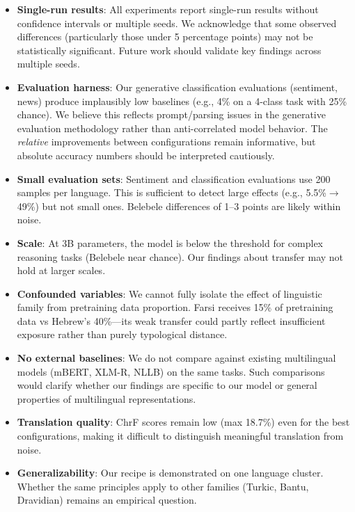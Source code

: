 \documentclass[10pt,twocolumn]{article}
\begin{document}
\begin{itemize}
    \item \textbf{Single-run results}: All experiments report single-run results without confidence intervals or multiple seeds. We acknowledge that some observed differences (particularly those under 5 percentage points) may not be statistically significant. Future work should validate key findings across multiple seeds.
    \item \textbf{Evaluation harness}: Our generative classification evaluations (sentiment, news) produce implausibly low baselines (e.g., 4\% on a 4-class task with 25\% chance). We believe this reflects prompt/parsing issues in the generative evaluation methodology rather than anti-correlated model behavior. The \emph{relative} improvements between configurations remain informative, but absolute accuracy numbers should be interpreted cautiously.
    \item \textbf{Small evaluation sets}: Sentiment and classification evaluations use 200 samples per language. This is sufficient to detect large effects (e.g., 5.5\%$\rightarrow$49\%) but not small ones. Belebele differences of 1--3 points are likely within noise.
    \item \textbf{Scale}: At 3B parameters, the model is below the threshold for complex reasoning tasks (Belebele near chance). Our findings about transfer may not hold at larger scales.
    \item \textbf{Confounded variables}: We cannot fully isolate the effect of linguistic family from pretraining data proportion. Farsi receives 15\% of pretraining data vs Hebrew's 40\%---its weak transfer could partly reflect insufficient exposure rather than purely typological distance.
    \item \textbf{No external baselines}: We do not compare against existing multilingual models (mBERT, XLM-R, NLLB) on the same tasks. Such comparisons would clarify whether our findings are specific to our model or general properties of multilingual representations.
    \item \textbf{Translation quality}: ChrF scores remain low (max 18.7\%) even for the best configurations, making it difficult to distinguish meaningful translation from noise.
    \item \textbf{Generalizability}: Our recipe is demonstrated on one language cluster. Whether the same principles apply to other families (Turkic, Bantu, Dravidian) remains an empirical question.
\end{itemize}
\end{document}
